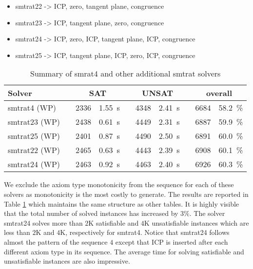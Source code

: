 \begin{itemize}
    \item smtrat22 -> ICP, zero, tangent plane, congruence
    \item smtrat23 -> ICP, tangent plane, zero, congruence
    \item smtrat24 -> ICP, zero, ICP, tangent plane, ICP, congruence
    \item smtrat25 -> ICP, tangent plane, ICP, zero, ICP, congruence
\end{itemize}

\begin{table}[h]
\caption{Summary of smrat4 and other additional smtrat solvers}
\begin{tabularx}{\textwidth}{lXrrXrrXrr}
	\toprule
	\textbf{Solver}
	&& \multicolumn{2}{c}{\textbf{SAT}}
	&& \multicolumn{2}{c}{\textbf{UNSAT}}
	&& \multicolumn{2}{c}{\textbf{overall}}
	\\
	\midrule
	smtrat4 (WP)
	&& 2336 & 1.55~s
	&& 4348 & 2.41~s
	&& 6684 & 58.2~\%
	\\
	smtrat23 (WP)
	&& 2438 & 0.61~s
	&& 4449 & 2.31~s
	&& 6887 & 59.9~\%
	\\
	smtrat25 (WP)
	&& 2401 & 0.87~s
	&& 4490 & 2.50~s
	&& 6891 & 60.0~\%
	\\
	smtrat22 (WP)
	&& 2465 & 0.63~s
	&& 4443 & 2.39~s
	&& 6908 & 60.1~\%
	\\
	smtrat24 (WP)
	&& 2463 & 0.92~s
	&& 4463 & 2.40~s
	&& 6926 & 60.3~\%
	\\
	\bottomrule
\end{tabularx}
\label{table:Summary_of_smrat4_and_other_additional_smtrat_solvers}
\end{table}

\noindent We exclude the axiom type monotonicity from the sequence for each of these solvers as monotonicity is the most costly to generate.
The results are reported in Table \ref{table:Summary_of_smrat4_and_other_additional_smtrat_solvers} which maintains the same structure as other tables.
It is highly visible that the total number of solved instances has increased by $3\%$.
The solver smtrat24 solves more than $2$K satisfiable and $4$K unsatisfiable instances  which are less than $2$K and $4$K, respectively for smtrat4.
Notice that smtrat24 follows almost the pattern of the sequence $4$ except that ICP is inserted after each different axiom type in its sequence.
The average time for solving satisfiable and unsatisfiable instances are also impressive.
\newline

% 


